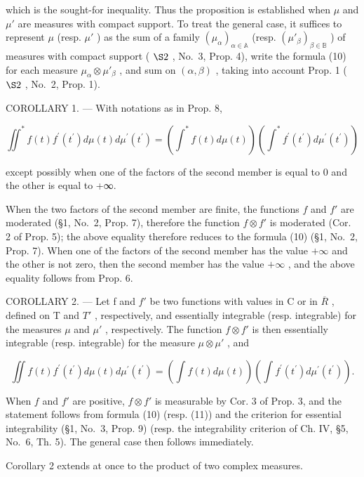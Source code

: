 which is the sought-for inequality. Thus the proposition is established when \(\mu\) and \(\mu'\) are measures with compact support. To treat the general case, it suffices to represent \(\mu\) (resp. \(\mu'\) ) as the sum of a family \((\mu_{\alpha})_{\alpha\in\mathbb{A}}\) (resp. \((\mu'_{\beta})_{\beta\in\mathbb{B}}\) ) of measures with compact support ( \(\S2\) , No.~3, Prop. 4), write the formula (10) for each measure \(\mu_{\alpha}\otimes\mu'_{\beta}\) , and sum on \((\alpha,\beta)\) , taking into account Prop. 1 ( \(\S2\) , No.~2, Prop. 1).

COROLLARY 1. --- With notations as in Prop. 8,

\[
\iint^ {*} f (t) f ^ {\prime} \left(t ^ {\prime}\right) d \mu (t) d \mu^ {\prime} \left(t ^ {\prime}\right) = \left(\int^ {*} f (t) d \mu (t)\right) \left(\int^ {*} f ^ {\prime} \left(t ^ {\prime}\right) d \mu^ {\prime} \left(t ^ {\prime}\right)\right)\tag{11}
\]

except possibly when one of the factors of the second member is equal to 0 and the other is equal to +∞.

When the two factors of the second member are finite, the functions \(f\) and \(f'\) are moderated (§1, No.~2, Prop. 7), therefore the function \(f \otimes f'\) is moderated (Cor. 2 of Prop. 5); the above equality therefore reduces to the formula (10) (§1, No.~2, Prop. 7). When one of the factors of the second member has the value \(+\infty\) and the other is not zero, then the second member has the value \(+\infty\) , and the above equality follows from Prop. 6.

COROLLARY 2. --- Let f and \(f'\) be two functions with values in C or in \(\overline{R}\) , defined on T and \(T'\) , respectively, and essentially integrable (resp. integrable) for the measures \(\mu\) and \(\mu'\) , respectively. The function \(f \otimes f'\) is then essentially integrable (resp. integrable) for the measure \(\mu \otimes \mu'\) , and

\[
\iint f (t) f ^ {\prime} \left(t ^ {\prime}\right) d \mu (t) d \mu^ {\prime} \left(t ^ {\prime}\right) = \left(\int f (t) d \mu (t)\right) \left(\int f ^ {\prime} \left(t ^ {\prime}\right) d \mu^ {\prime} \left(t ^ {\prime}\right)\right).\tag{12}
\]

When \(f\) and \(f'\) are positive, \(f \otimes f'\) is measurable by Cor. 3 of Prop. 3, and the statement follows from formula (10) (resp. (11)) and the criterion for essential integrability (§1, No.~3, Prop. 9) (resp. the integrability criterion of Ch. IV, §5, No.~6, Th. 5). The general case then follows immediately.

Corollary 2 extends at once to the product of two complex measures.

